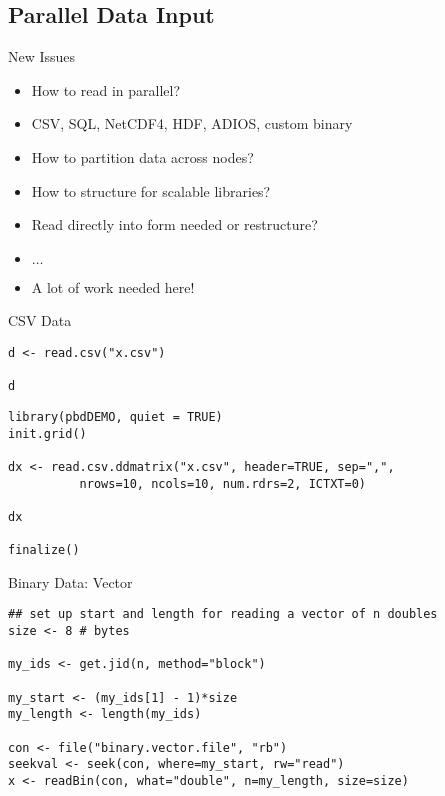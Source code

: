 \subsection{Parallel Data Input}
\makesubcontentsslidessec


\begin{frame}
  \begin{block}{New Issues}\pause
    \begin{itemize}
    \item How to read in parallel?
    \item CSV, SQL, NetCDF4, HDF, ADIOS, custom binary
    \item How to partition data across nodes?
    \item How to structure for scalable libraries?
    \item Read directly into form needed or restructure?
    \item $\ldots$
    \item A lot of work needed here!
    \end{itemize}
  \end{block}
\end{frame}



\begin{frame}[fragile]
  \begin{exampleblock}{CSV Data}\pause
\begin{lstlisting}[title=Serial Code]
d <- read.csv("x.csv")

d
\end{lstlisting}

\begin{lstlisting}[title=Parallel Code]
library(pbdDEMO, quiet = TRUE)
init.grid()

dx <- read.csv.ddmatrix("x.csv", header=TRUE, sep=",", 
          nrows=10, ncols=10, num.rdrs=2, ICTXT=0)

dx

finalize()
\end{lstlisting}
  \end{exampleblock}
\end{frame}

\begin{frame}[fragile]
  \begin{exampleblock}{Binary Data: Vector}\pause
    \begin{lstlisting}
## set up start and length for reading a vector of n doubles
size <- 8 # bytes

my_ids <- get.jid(n, method="block")

my_start <- (my_ids[1] - 1)*size
my_length <- length(my_ids)

con <- file("binary.vector.file", "rb")
seekval <- seek(con, where=my_start, rw="read")
x <- readBin(con, what="double", n=my_length, size=size)
    \end{lstlisting}
  \end{exampleblock}
\end{frame}

